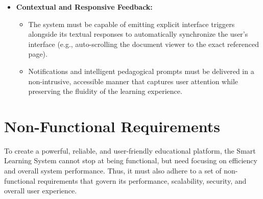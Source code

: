 \begin{itemize}
    \item \textbf{Contextual and Responsive Feedback:}
    \begin{itemize}
        \item The system must be capable of emitting explicit interface triggers alongside its textual responses to automatically synchronize the user's interface (e.g., auto-scrolling the document viewer to the exact referenced page).
        \item Notifications and intelligent pedagogical prompts must be delivered in a non-intrusive, accessible manner that captures user attention while preserving the fluidity of the learning experience.
    \end{itemize}
\end{itemize}


\section{Non-Functional Requirements}\label{sec:nonfun}
To create a powerful, reliable, and user-friendly educational platform, the Smart Learning System cannot stop at being functional, but need focusing on efficiency 
and overall system performance. Thus, it must also adhere to a set of non-functional requirements that govern its 
performance, scalability, security, and overall user experience.

